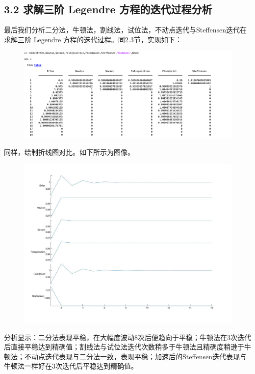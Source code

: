 \documentclass{article}
\begin{document}
\subsection{3.2 求解三阶 Legendre 方程的迭代过程分析}

    最后我们分析二分法，牛顿法，割线法，试位法，不动点迭代与Steffensen迭代在求解三阶 Legendre 方程的迭代过程。同2.3节，实现如下：

    \begin{figure}[h]
    \centering
    \includegraphics[scale=0.4]{Eq1_ENSFFS_Table.jpg}
    \end{figure}

    同样，绘制折线图对比。如下所示为图像。

    \begin{figure}[h]
    \centering
    \includegraphics[scale=0.18]{Eq1_ENSFFS.jpg}
    \end{figure}

    分析显示：二分法表现平稳，在大幅度波动8次后便趋向于平稳；牛顿法在3次迭代后直接平稳达到精确值；割线法与试位法迭代次数稍多于牛顿法且精确度稍逊于牛顿法；不动点迭代表现与二分法一致，表现平稳；加速后的Steffensen迭代表现与牛顿法一样好在3次迭代后平稳达到精确值。
\end{document}
